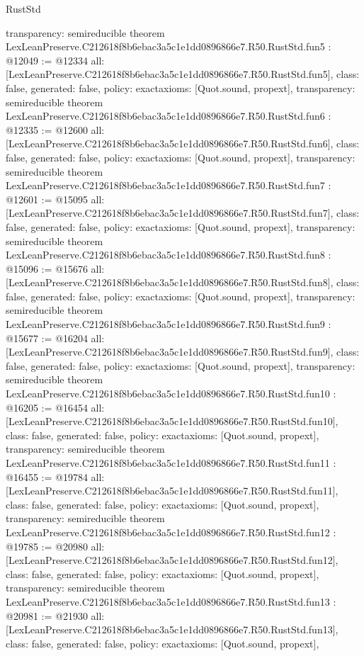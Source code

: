 \begin{lexlean}{RustStd}
\begin{coremodule}
{  transparency: semireducible
}
theorem LexLeanPreserve.C212618f8b6ebac3a5c1e1dd0896866e7.R50.RustStd.fun5 : @12049 := @12334 {
  all: [LexLeanPreserve.C212618f8b6ebac3a5c1e1dd0896866e7.R50.RustStd.fun5],
  class: false,
  generated: false,
  policy: exact{axioms: [Quot.sound, propext]},
  transparency: semireducible
}
theorem LexLeanPreserve.C212618f8b6ebac3a5c1e1dd0896866e7.R50.RustStd.fun6 : @12335 := @12600 {
  all: [LexLeanPreserve.C212618f8b6ebac3a5c1e1dd0896866e7.R50.RustStd.fun6],
  class: false,
  generated: false,
  policy: exact{axioms: [Quot.sound, propext]},
  transparency: semireducible
}
theorem LexLeanPreserve.C212618f8b6ebac3a5c1e1dd0896866e7.R50.RustStd.fun7 : @12601 := @15095 {
  all: [LexLeanPreserve.C212618f8b6ebac3a5c1e1dd0896866e7.R50.RustStd.fun7],
  class: false,
  generated: false,
  policy: exact{axioms: [Quot.sound, propext]},
  transparency: semireducible
}
theorem LexLeanPreserve.C212618f8b6ebac3a5c1e1dd0896866e7.R50.RustStd.fun8 : @15096 := @15676 {
  all: [LexLeanPreserve.C212618f8b6ebac3a5c1e1dd0896866e7.R50.RustStd.fun8],
  class: false,
  generated: false,
  policy: exact{axioms: [Quot.sound, propext]},
  transparency: semireducible
}
theorem LexLeanPreserve.C212618f8b6ebac3a5c1e1dd0896866e7.R50.RustStd.fun9 : @15677 := @16204 {
  all: [LexLeanPreserve.C212618f8b6ebac3a5c1e1dd0896866e7.R50.RustStd.fun9],
  class: false,
  generated: false,
  policy: exact{axioms: [Quot.sound, propext]},
  transparency: semireducible
}
theorem LexLeanPreserve.C212618f8b6ebac3a5c1e1dd0896866e7.R50.RustStd.fun10 : @16205 := @16454 {
  all: [LexLeanPreserve.C212618f8b6ebac3a5c1e1dd0896866e7.R50.RustStd.fun10],
  class: false,
  generated: false,
  policy: exact{axioms: [Quot.sound, propext]},
  transparency: semireducible
}
theorem LexLeanPreserve.C212618f8b6ebac3a5c1e1dd0896866e7.R50.RustStd.fun11 : @16455 := @19784 {
  all: [LexLeanPreserve.C212618f8b6ebac3a5c1e1dd0896866e7.R50.RustStd.fun11],
  class: false,
  generated: false,
  policy: exact{axioms: [Quot.sound, propext]},
  transparency: semireducible
}
theorem LexLeanPreserve.C212618f8b6ebac3a5c1e1dd0896866e7.R50.RustStd.fun12 : @19785 := @20980 {
  all: [LexLeanPreserve.C212618f8b6ebac3a5c1e1dd0896866e7.R50.RustStd.fun12],
  class: false,
  generated: false,
  policy: exact{axioms: [Quot.sound, propext]},
  transparency: semireducible
}
theorem LexLeanPreserve.C212618f8b6ebac3a5c1e1dd0896866e7.R50.RustStd.fun13 : @20981 := @21930 {
  all: [LexLeanPreserve.C212618f8b6ebac3a5c1e1dd0896866e7.R50.RustStd.fun13],
  class: false,
  generated: false,
  policy: exact{axioms: [Quot.sound, propext]},
}
\end{coremodule}
\end{lexlean}
